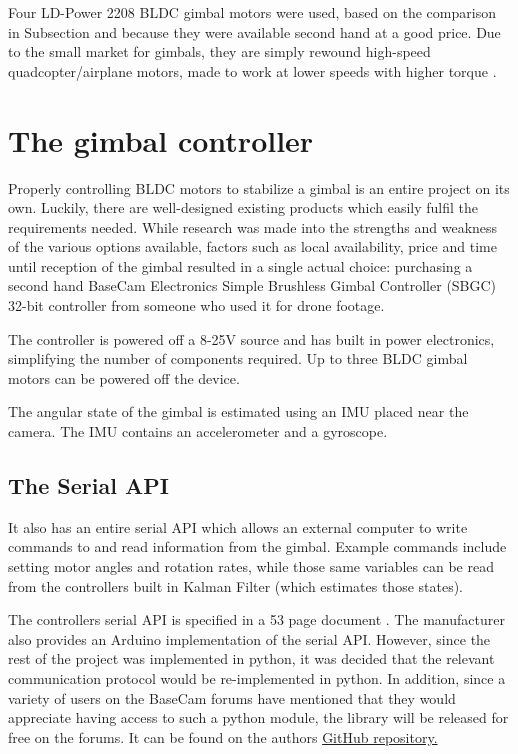 Four LD-Power 2208 BLDC gimbal motors were used, based on the comparison in Subsection \label{ssec:gimbal_comparison} and because they were available second hand at a good price. Due to the small market for gimbals, they are simply rewound high-speed quadcopter/airplane motors, made to work at lower speeds with higher torque \cite{website:rewinding_bldc_gimbal}.

\section{The gimbal controller}
Properly controlling BLDC motors to stabilize a gimbal is an entire project on its own. Luckily, there are well-designed existing products which easily fulfil the requirements needed. While research was made into the strengths and weakness of the various options available, factors such as local availability, price and time until reception of the gimbal resulted in a single actual choice: purchasing a second hand BaseCam Electronics Simple Brushless Gimbal Controller (SBGC) 32-bit controller \cite{website:basecam_sbgc} from someone who used it for drone footage.

The controller is powered off a 8-25V source and has built in power electronics, simplifying the number of components required. Up to three BLDC gimbal motors can be powered off the device.

The angular state of the gimbal is estimated using an IMU placed near the camera. The IMU contains an accelerometer and a gyroscope.

\subsection{The Serial API}

It also has an entire serial API which allows an external computer to write commands to and read information from the gimbal. Example commands include setting motor angles and rotation rates, while those same variables can be read from the controllers built in Kalman Filter (which estimates those states).

The controllers serial API is specified in a 53 page document \cite{website:sbgc_serial_api}. The manufacturer also provides an Arduino implementation of the serial API. However, since the rest of the project was implemented in python, it was decided that the relevant communication protocol would be re-implemented in python. In addition, since a variety of users on the BaseCam forums have mentioned that they would appreciate having access to such a python module, the library will be released for free on the forums. It can be found on the authors \href{https://github.com/alknemeyer/EEE4022S-Thesis-Project/blob/master/Final%20code/gimbal_control.ipynb}{GitHub repository.}

